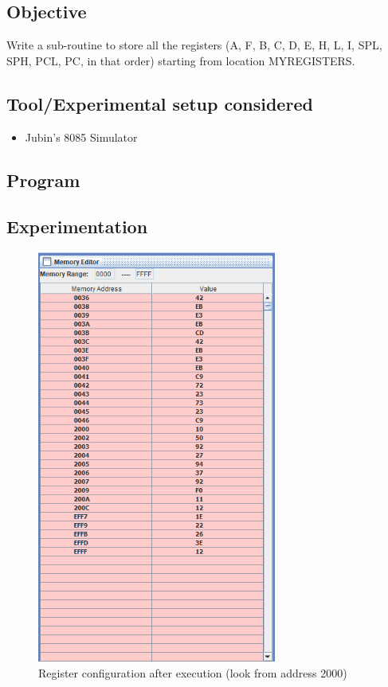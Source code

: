 \documentclass[a4paper]{article} %
\begin{document}
    \subsection{Objective}
        Write a sub-routine to store all the registers (A, F, B, C, D, E, H, L, I, SPL, SPH, PCL, PC, in that order) starting from location MYREGISTERS.
    \subsection{Tool/Experimental setup considered}
        \begin{itemize}
            \item Jubin's 8085 Simulator
        \end{itemize}
    \subsection{Program}
        
        \newpage
    \subsection{Experimentation}
        \begin{figure}[h!]
            \centering
            \includegraphics[width=0.7\textwidth]{Assignment 3/3_save_reg_config/mem.png}
            \caption{Register configuration after execution (look from address 2000)}
            \label{fg8}
        \end{figure}
\end{document}
